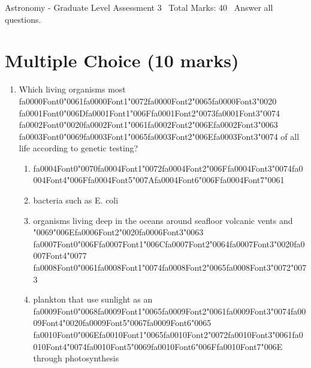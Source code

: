 \documentclass[12pt]{article}
\begin{document}
\begin{center}
Astronomy - Graduate Level Assessment 3 \
Total Marks: 40 \
Answer all questions.
\end{center}

\section*{Multiple Choice (10 marks)}
\begin{enumerate}[label=\arabic*.]
\item Which living organisms most {\csname fa0000Font0\endcsname\char"0061}{\csname fa0000Font1\endcsname\char"0072}{\csname fa0000Font2\endcsname\char"0065}{\csname fa0000Font3\endcsname\char"0020} {\csname fa0001Font0\endcsname\char"006D}{\csname fa0001Font1\endcsname\char"006F}{\csname fa0001Font2\endcsname\char"0073}{\csname fa0001Font3\endcsname\char"0074} {\csname fa0002Font0\endcsname\char"0020}{\csname fa0002Font1\endcsname\char"0061}{\csname fa0002Font2\endcsname\char"006E}{\csname fa0002Font3\endcsname\char"0063} {\csname fa0003Font0\endcsname\char"0069}{\csname fa0003Font1\endcsname\char"0065}{\csname fa0003Font2\endcsname\char"006E}{\csname fa0003Font3\endcsname\char"0074} of all life according to genetic
testing?
\begin{enumerate}[label=(\alph*)]
    \item {\csname fa0004Font0\endcsname\char"0070}{\csname fa0004Font1\endcsname\char"0072}{\csname fa0004Font2\endcsname\char"006F}{\csname fa0004Font3\endcsname\char"0074}{\csname fa0004Font4\endcsname\char"006F}{\csname fa0004Font5\endcsname\char"007A}{\csname fa0004Font6\endcsname\char"006F}{\csname fa0004Font7\endcsname\char"0061}
    \item bacteria such as E. coli
    \item organisms living deep in the oceans around seafloor volcanic vents and {\char"0069}{\char"006E}{\csname fa0006Font2\endcsname\char"0020}{\csname fa0006Font3\endcsname\char"0063} {\csname fa0007Font0\endcsname\char"006F}{\csname fa0007Font1\endcsname\char"006C}{\csname fa0007Font2\endcsname\char"0064}{\csname fa0007Font3\endcsname\char"0020}{\csname fa0007Font4\endcsname\char"0077} {\csname fa0008Font0\endcsname\char"0061}{\csname fa0008Font1\endcsname\char"0074}{\csname fa0008Font2\endcsname\char"0065}{\csname fa0008Font3\endcsname\char"0072}{\char"0073}
    \item plankton that use sunlight as an {\csname fa0009Font0\endcsname\char"0068}{\csname fa0009Font1\endcsname\char"0065}{\csname fa0009Font2\endcsname\char"0061}{\csname fa0009Font3\endcsname\char"0074}{\csname fa0009Font4\endcsname\char"0020}{\csname fa0009Font5\endcsname\char"0067}{\csname fa0009Font6\endcsname\char"0065} {\csname fa0010Font0\endcsname\char"006E}{\csname fa0010Font1\endcsname\char"0065}{\csname fa0010Font2\endcsname\char"0072}{\csname fa0010Font3\endcsname\char"0061}{\csname fa0010Font4\endcsname\char"0074}{\csname fa0010Font5\endcsname\char"0069}{\csname fa0010Font6\endcsname\char"006F}{\csname fa0010Font7\endcsname\char"006E} through photosynthesis

\end{enumerate}
\end{enumerate}
\end{document}
